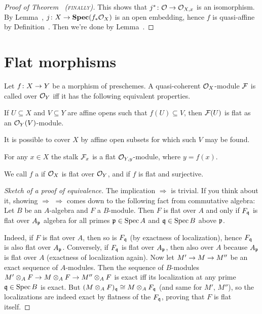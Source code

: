 \documentclass[a4paper,parskip=half,numbers=enddot, DIV=12]{scrreprt}
\begin{document}
\begin{proof}[Proof of Theorem~ \textsc{(finally)}]
This shows that $j^*\colon \Oo\morphism\Oo_{X,x}$ is an isomorphism. By Lemma~, $j\colon X\morphism\SPEC(f_*\Oo_X)$ is an open embedding, hence $f$ is quasi-affine by Definition~.  Then we're done by Lemma~.
\end{proof}


\chapter{Flat morphisms}
\begin{defi}
	Let $f\colon X\morphism Y$ be a morphism of preschemes. A quasi-coherent $\mathcal{O}_X$-module $\mathcal{F}$ is called  over $\mathcal{O}_Y$ iff it has the following equivalent properties.
	\begin{alphanumerate}
		\item If $U\subseteq X$ and $V\subseteq Y$ are affine opens such that $f(U)\subseteq V$, then $\mathcal{F}(U)$ is flat as an $\mathcal{O}_Y(V)$-module.
		\item It is possible to cover $X$ by affine open subsets for which such $V$ may be found.
		\item For any $x\in X$ the stalk $\mathcal{F}_x$ is a flat $\mathcal{O}_{Y,y}$-module, where $y=f(x)$.
	\end{alphanumerate}
	We call $f$ a  if $\mathcal{O}_X$ is flat over $\mathcal{O}_Y$, and  if $f$ is flat and surjective.
\end{defi}
\begin{proof}[Sketch of a proof of equivalence]
	The implication  $\Rightarrow$  is trivial. If you think about it, showing  $\Rightarrow$  $\Rightarrow$  comes down to the following fact from commutative algebra: Let $B$ be an $A$-algebra and $F$ a $B$-module. Then $F$ is flat over $A$ and only if $F_{\mathfrak{q}}$ is flat over $A_{\mathfrak{p}}$ algebra for all primes $\mathfrak{p}\in\operatorname{Spec} A$ and $\mathfrak{q}\in\operatorname{Spec} B$ above $\mathfrak{p}$.
	
	Indeed, if $F$ is flat over $A$, then so is $F_{\mathfrak{q}}$ (by exactness of localization), hence $F_{\mathfrak{q}}$ is also flat over $A_{\mathfrak{p}}$. Conversely, if $F_{\mathfrak{q}}$ is flat over $A_{\mathfrak{p}}$, then also over $A$ because $A_{\mathfrak{p}}$ is flat over $A$ (exactness of localization again). Now let $M'\morphism M\morphism M''$ be an exact sequence of $A$-modules. Then the sequence of $B$-modules $M'\otimes_AF\morphism M\otimes_AF\morphism M''\otimes_AF$ is exact iff its localization at any prime $\mathfrak{q}\in \operatorname{Spec} B$ is exact. But $(M\otimes_AF)_{\mathfrak{q}}\cong M\otimes_AF_{\mathfrak{q}}$ (and same for $M'$, $M''$), so the localizations are indeed exact by flatness of the $F_{\mathfrak{q}}$, proving that $F$ is flat itself.
\end{proof}
\end{document}
